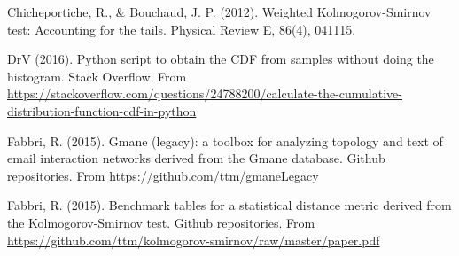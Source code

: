 \documentclass[12pt,fleqn]{article}
\begin{document}
\begin{thebibliography}{99}
\fontsize{11}{0}\selectfont
{}
Chicheportiche, R., \& Bouchaud, J. P. (2012). Weighted Kolmogorov-Smirnov test: Accounting for the tails. Physical Review E, 86(4), 041115.

	DrV (2016). Python script to obtain the CDF from samples without doing the histogram.
		Stack Overflow.
		From \url{https://stackoverflow.com/questions/24788200/calculate-the-cumulative-distribution-function-cdf-in-python}

	Fabbri, R. (2015). Gmane (legacy): a toolbox for analyzing topology and text of email interaction networks derived from the Gmane database. Github repositories. From \url{https://github.com/ttm/gmaneLegacy}

	Fabbri, R. (2015). Benchmark tables for a statistical distance metric derived from the Kolmogorov-Smirnov test. Github repositories. From \url{https://github.com/ttm/kolmogorov-smirnov/raw/master/paper.pdf}
\end{thebibliography}





\end{document}
